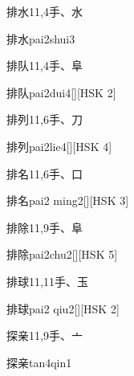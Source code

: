 \begin{entry}{排水}{11,4}{⼿、⽔}
  \begin{phonetics}{排水}{pai2shui3}
  \end{phonetics}
\end{entry}

\begin{entry}{排队}{11,4}{⼿、⾩}
  \begin{phonetics}{排队}{pai2dui4}[][HSK 2]
  \end{phonetics}
\end{entry}

\begin{entry}{排列}{11,6}{⼿、⼑}
  \begin{phonetics}{排列}{pai2lie4}[][HSK 4]
  \end{phonetics}
\end{entry}

\begin{entry}{排名}{11,6}{⼿、⼝}
  \begin{phonetics}{排名}{pai2 ming2}[][HSK 3]
  \end{phonetics}
\end{entry}

\begin{entry}{排除}{11,9}{⼿、⾩}
  \begin{phonetics}{排除}{pai2chu2}[][HSK 5]
  \end{phonetics}
\end{entry}

\begin{entry}{排球}{11,11}{⼿、⽟}
  \begin{phonetics}{排球}{pai2 qiu2}[][HSK 2]
  \end{phonetics}
\end{entry}

\begin{entry}{探亲}{11,9}{⼿、⼇}
  \begin{phonetics}{探亲}{tan4qin1}
  \end{phonetics}
\end{entry}

